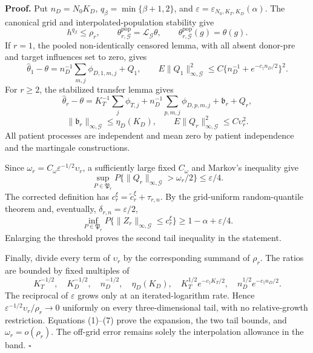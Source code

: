 \textbf{Proof.}
Put \(n_D=N_0K_D\), \(q_\beta=\min\{\beta+1,2\}\), and \(\varepsilon=\varepsilon_{N_0,K_T,K_D}(\alpha)\). The canonical grid and interpolated-population stability give
\[
 h^{q_\beta}\le\rho_r,\qquad
 \theta^{\mathrm{pop}}_{r,\mathcal G}=\mathcal L_{\mathcal G}\theta,\qquad
 \theta^{\mathrm{pop}}_{r,\mathcal G}(g)=\theta(g).       \tag{1}
\]
If \(r=1\), the pooled non-identically censored lemma, with all absent donor-pre and target influences set to zero, gives
\[
 \widehat\theta_1-\theta=n_D^{-1}\sum_{m,j}\phi_{D,1,m,j}+Q_1,
 \qquad E\|Q_1\|_{\infty,\mathcal G}^2
 \le C\{n_D^{-1}+e^{-c_\dagger n_D/2}\}^2.              \tag{2}
\]
For \(r\ge2\), the stabilized transfer lemma gives
\[
 \widehat\theta_r-\theta
 =K_T^{-1}\sum_j\phi_{T,j}+n_D^{-1}\sum_{p,m,j}\phi_{D,p,m,j}
 +\mathfrak b_r+Q_r,                                      \tag{3}
\]
\[
 \|\mathfrak b_r\|_{\infty,\mathcal G}\le\eta_D(K_D),\qquad
 E\|Q_r\|_{\infty,\mathcal G}^2\le C\upsilon_r^2.      \tag{4}
\]
All patient processes are independent and mean zero by patient independence and the martingale constructions.

Since \(\omega_r=C_\omega\varepsilon^{-1/2}\upsilon_r\), a sufficiently large fixed \(C_\omega\) and Markov's inequality give
\[
 \sup_{P\in\mathfrak P_r}P\{\|Q_r\|_{\infty,\mathcal G}>\omega_r/2\}
 \le\varepsilon/4.                                       \tag{5}
\]
The corrected definition has \(c_r^\xi=\widetilde c_r^\xi+\tau_{r,n}\). By the grid-uniform random-quantile theorem and, eventually, \(\delta_{r,n}=\varepsilon/2\),
\[
 \inf_{P\in\mathfrak P_r}P\{\|Z_r\|_{\infty,\mathcal G}\le c_r^\xi\}
 \ge1-\alpha+\varepsilon/4.                              \tag{6}
\]
Enlarging the threshold proves the second tail inequality in the statement.

Finally, divide every term of \(\upsilon_r\) by the corresponding summand of \(\rho_r\). The ratios are bounded by fixed multiples of
\[
 K_T^{-1/2},\quad K_D^{-1/2},\quad n_D^{-1/2},\quad
 \eta_D(K_D),\quad K_T^{1/2}e^{-c_\dagger K_T/2},\quad
 n_D^{1/2}e^{-c_\dagger n_D/2}.                           \tag{7}
\]
The reciprocal of \(\varepsilon\) grows only at an iterated-logarithm rate. Hence \(\varepsilon^{-1/2}\upsilon_r/\rho_r\to0\) uniformly on every three-dimensional tail, with no relative-growth restriction. Equations (1)--(7) prove the expansion, the two tail bounds, and \(\omega_r=o(\rho_r)\). The off-grid error remains solely the interpolation allowance in the band. \(\square\)